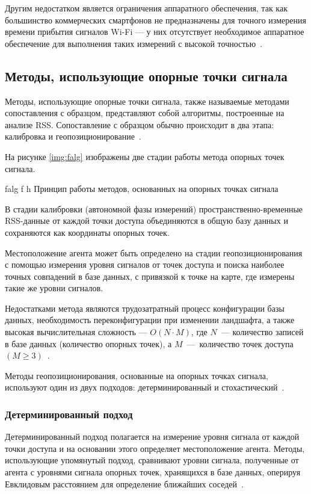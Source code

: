 Другим недостатком является ограничения аппаратного обеспечения, так как большинство коммерческих смартфонов не предназначены для точного измерения времени прибытия сигналов Wi-Fi --- у них отсутствует необходимое аппаратное обеспечение для выполнения таких измерений с высокой точностью~\cite{urban-info}.

\clearpage

\subsection{Методы, использующие опорные точки сигнала}

Методы, использующие опорные точки сигнала, также называемые методами сопоставления с образцом, представляют собой алгоритмы, построенные на анализе RSS. Сопоставление с образцом обычно происходит в два этапа: калибровка и геопозиционирование~\cite{intro}.

На рисунке \ref{img:falg} изображены две стадии работы метода опорных точек сигнала.

    {falg}
    {f}
    {h}
    {\linewidth}
    {Принцип работы методов, основанных на опорных точках сигнала}

В стадии калибровки (автономной фазы измерений) пространственно-временные RSS-данные от каждой точки доступа объединяются в общую базу данных и сохраняются как координаты опорных точек.

Местоположение агента может быть определено на стадии геопозиционирования с помощью измерения уровня сигналов от точек доступа и поиска наиболее точных совпадений в базе данных, с привязкой к точке на карте, где измерены такие же уровни сигналов.

Недостатками метода являются трудозатратный процесс конфигурации базы данных, необходимость переконфигурации при изменении ландшафта, а также высокая вычислительная сложность --- $O(N\cdot M)$, где $N$~--- количество записей в базе данных (количество опорных точек), а $M$~---~количество точек доступа $(M \geq 3)$~\cite{fingerprint}.

Методы геопозиционирования, основанные на опорных точках сигнала, используют один из двух подходов: детерминированный и стохастический~\cite{intro}.

\subsubsection{Детерминированный подход}

Детерминированный подход полагается на измерение уровня сигнала от каждой точки доступа и на основании этого определяет местоположение агента. Методы, использующие упомянутый подход, сравнивают уровни сигнала, полученные от агента с уровнями сигнала опорных точек, хранящихся в базе данных, оперируя Евклидовым расстоянием для определение ближайших соседей~\cite{fingerprint}.

